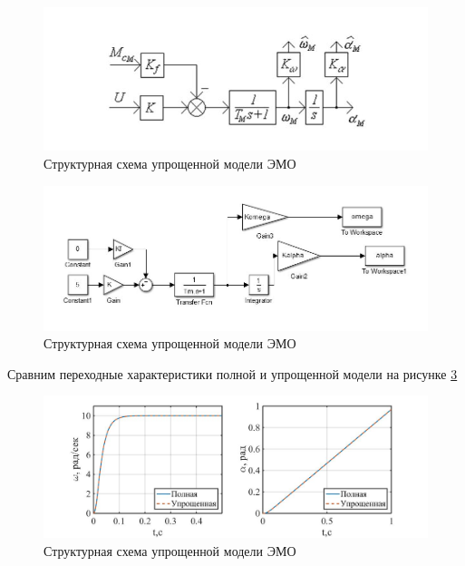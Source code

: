 \documentclass[a4paper, 12pt]{article}
\begin{document}
\begin{figure}[h!]
	\centering
	\includegraphics[width = 1\textwidth]{notfullstrEMO}
	\caption{Структурная схема упрощенной модели ЭМО}
	\label{nstrEMO}
\end{figure}

\begin{figure}[h!]
	\centering
	\includegraphics[width = 1\textwidth]{notfullmod}
	\caption{Структурная схема упрощенной модели ЭМО}
	\label{nfuncEMO}
\end{figure}
Сравним переходные характеристики полной и упрощенной модели на рисунке \ref{full_nfull}
\newpage
\begin{figure}[h!]
	\centering
	\includegraphics[width = 1\textwidth]{data/full_notfull}
	\caption{Структурная схема упрощенной модели ЭМО}
	\label{full_nfull}
\end{figure}
 
\newpage
\end{document}
